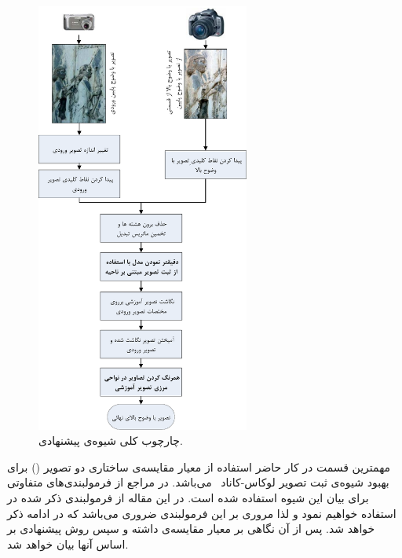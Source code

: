 \documentclass[conference]{IEEEtran-ModifiedForMVIP}
\begin{document}
\begin{figure}[t]
\centering 
\includegraphics[width=70mm]{Images/OneLR_oneHR.pdf}
\caption{چارچوب کلی شیوه‌ی پیشنهادی.}\label{fig:OneLR_oneHR}
\end{figure}


مهمترین قسمت در کار حاضر استفاده از معیار مقایسه‌ی ساختاری دو تصویر () برای بهبود شیوه‌ی ثبت تصویر لوکاس-کاناد~\cite{Lucas81iterative} می‌باشد. در مراجع از فرمولبندی‌های متفاوتی برای بیان این شیوه استفاده شده است. در این مقاله از فرمولبندی ذکر شده در \cite{Baker04lucas-kanade20part1} استفاده خواهیم نمود و لذا مروری بر این فرمولبندی ضروری می‌باشد که در ادامه ذکر خواهد شد. پس از آن نگاهی بر معیار مقایسه‌ی  داشته و سپس روش پیشنهادی بر اساس آنها بیان خواهد شد.
\end{document}
